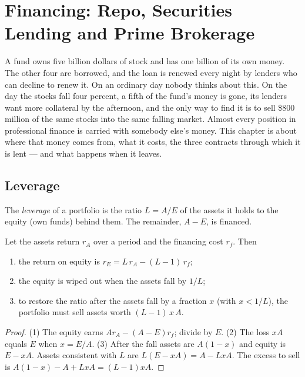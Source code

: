 \chapter{Financing: Repo, Securities Lending and Prime Brokerage}\label{ch:m1:financing}

A fund owns five billion dollars of stock and has one billion of its own
money. The other four are borrowed, and the loan is renewed every night by
lenders who can decline to renew it. On an ordinary day nobody thinks about
this. On the day the stocks fall four percent, a fifth of the fund's money
is gone, its lenders want more collateral by the afternoon, and the only way
to find it is to sell \$800 million of the same stocks into the same falling
market. Almost every position in professional finance is carried with
somebody else's money. This chapter is about where that money comes from,
what it costs, the three contracts through which it is lent --- and what
happens when it leaves.

\section{Leverage}

\begin{definition}[Leverage]\label{def:m1:financing:leverage}
The \emph{leverage} of a portfolio is the ratio $L = A/E$ of
the assets it holds to the equity (own funds) behind them. The remainder,
$A - E$, is financed.
\end{definition}

\begin{proposition}\label{prop:m1:financing:roe}
Let the assets return $r_A$ over a period and the financing cost $r_f$. Then
\begin{enumerate}
\item the return on equity is $r_E = L\,r_A - (L-1)\,r_f$;
\item the equity is wiped out when the assets fall by $1/L$;
\item to restore the  ratio after the assets fall by a fraction $x$
(with $x < 1/L$), the portfolio must sell assets worth $(L-1)\,x\,A$.
\end{enumerate}
\end{proposition}
\begin{proof}
(1) The equity earns $A r_A - (A-E) r_f$; divide by $E$. (2) The loss $xA$
equals $E$ when $x = E/A$. (3) After the fall assets are $A(1-x)$ and equity
is $E - xA$. Assets consistent with  $L$ are $L(E - xA) = A - LxA$.
The excess to sell is $A(1-x) - A + LxA = (L-1)xA$.
\end{proof}

